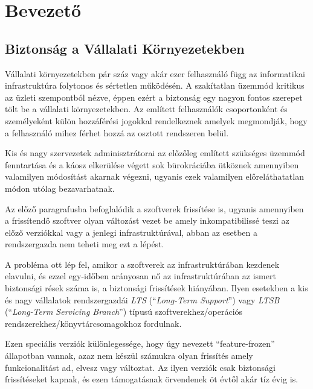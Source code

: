 \documentclass[a4paper,12pt]{article}
\begin{document}
	\begingroup
	\hypersetup{linkcolor=lightblue}
	\listoffigures
	\renewcommand*{\listoflistingscaption}{Kódrészletek jegyzéke}
	\listoflistings
	\endgroup

\newpage
\pagestyle{fancy}
\section{Bevezető}
	
\subsection{Biztonság a Vállalati Környezetekben}

	Vállalati környezetekben pár száz vagy akár ezer felhasználó függ az informatikai infrastruktúra folytonos és sértetlen működésén. A szakítatlan üzemmód kritikus az üzleti szempontból nézve, éppen ezért a biztonság egy nagyon fontos szerepet tölt be a vállalati környezetekben. Az említett felhasználók csoportonként és személyeként külön hozzáférési jogokkal rendelkeznek amelyek megmondják, hogy a felhasználó mihez férhet hozzá az osztott rendszeren belül.
	
	Kis és nagy szervezetek adminisztrátorai az előzőleg említett szükséges üzemmód fenntartása és a káosz elkerülése végett sok bürokráciába ütköznek amennyiben valamilyen módosítást akarnak végezni, ugyanis ezek valamilyen előreláthatatlan módon utólag bezavarhatnak.
	
	Az előző paragrafusba befoglalódik a szoftverek frissítése is, ugyanis amennyiben a frissítendő szoftver olyan változást vezet be amely inkompatibilissé teszi az előző verziókkal vagy a jenlegi infrastruktúrával, abban az esetben a rendszergazda nem teheti meg ezt a lépést.
	
	A probléma ott lép fel, amikor a szoftverek az infrastruktúrában kezdenek elavulni, és ezzel egy-időben arányosan nő az infrastruktúrában az ismert biztonsági rések száma is, a biztonsági frissítések hiányában. Ilyen esetekben a kis és nagy vállalatok rendszergazdái \textit{LTS} (``\textit{Long-Term Support}'') vagy \textit{LTSB} (``\textit{Long-Term Servicing Branch}'') típusú szoftverekhez/operációs rendszerekhez/könyvtárcsomagokhoz fordulnak.
	
	Ezen speciális verziók különlegessége, hogy úgy nevezett ``feature-frozen'' állapotban vannak, azaz nem készül számukra olyan frissítés amely funkcionalitást ad, elvesz vagy változtat. Az ilyen verziók csak biztonsági frissítéseket kapnak, és ezen támogatásnak örvendenek öt évtől akár tíz évig is.
	
\end{document}
